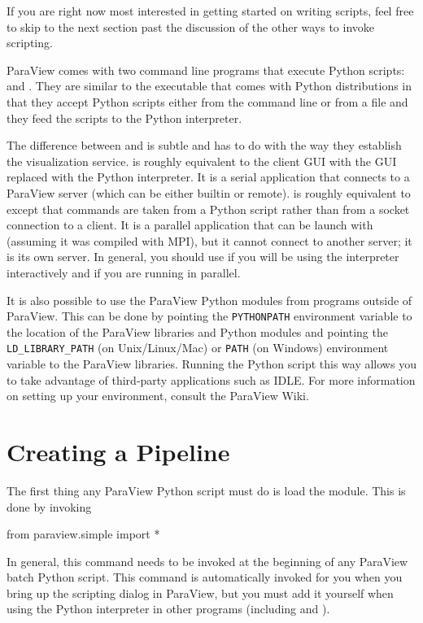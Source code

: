 If you are right now most interested in getting started on writing scripts,
feel free to skip to the next section past the discussion of the other ways
to invoke scripting.

ParaView comes with two command line programs that execute Python scripts:
 and .  They are similar to the
 executable that comes with Python distributions in
that they accept Python scripts either from the command line or from a file
and they feed the scripts to the Python interpreter.

The difference between  and  is
subtle and has to do with the way they establish the visualization
service.   is roughly equivalent to the
 client GUI with the GUI replaced with the Python
interpreter.  It is a serial application that connects to a ParaView server
(which can be either builtin or remote).   is roughly
equivalent to  except that commands are taken from a
Python script rather than from a socket connection to a client.  It is a
parallel application that can be launch with  (assuming
it was compiled with MPI), but it cannot connect to another server; it is
its own server.  In general, you should use  if you
will be using the interpreter interactively and  if
you are running in parallel.

It is also possible to use the ParaView Python modules from programs
outside of ParaView.  This can be done by pointing the \texttt{PYTHONPATH}
environment variable to the location of the ParaView libraries and Python
modules and pointing the \texttt{LD\_LIBRARY\_PATH} (on Unix/Linux/Mac) or
\texttt{PATH} (on Windows) environment variable to the ParaView libraries.
Running the Python script this way allows you to take advantage of
third-party applications such as IDLE.  For more information on setting up
your environment, consult the ParaView Wiki.

\section{Creating a Pipeline}
\label{sec:CreatingAPipeline}

The first thing any ParaView Python script must do is load the
 module.  This is done by invoking
\begin{python}
from paraview.simple import *
\end{python}
In general, this command needs to be invoked at the beginning of any
ParaView batch Python script.  This command is automatically invoked for
you when you bring up the scripting dialog in ParaView, but you must add it
yourself when using the Python interpreter in other programs (including
 and ).

